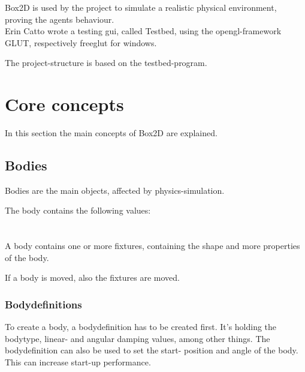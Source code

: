 \documentclass[10pt,a4paper,DIV=11]{scrreprt}
\begin{document}
Box2D is used by the project to simulate a realistic physical environment, proving the agents behaviour. \\

Erin Catto wrote a testing gui, called Testbed, using the opengl-framework GLUT, respectively freeglut for windows.

The project-structure is based on the testbed-program.


\section{Core concepts}
In this section the main concepts of Box2D are explained.


\subsection{Bodies}
Bodies are the main objects, affected by physics-simulation.

The body contains the following values: \\

   \\
\\



A body contains one or more fixtures, containing the shape and more properties of the body.

If a body is moved, also the fixtures are moved.

\subsubsection*{Bodydefinitions}
To create a body, a bodydefinition has to be created first. It's holding the bodytype, linear- and angular damping values, among other things.
The bodydefinition can also be used to set the start- position and angle of the body. This can increase start-up performance.
\end{document}
